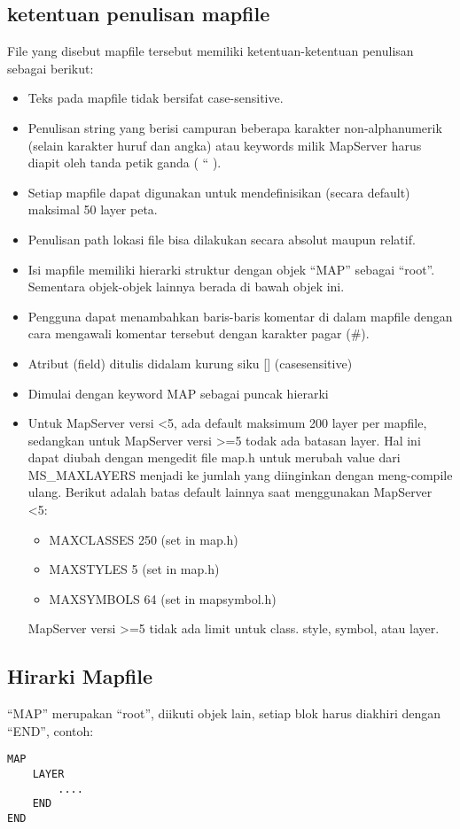 \begin{vebatim}
\subsection{ketentuan penulisan mapfile}
File yang disebut mapfile tersebut memiliki ketentuan-ketentuan penulisan sebagai berikut:
\begin{itemize}
	\item Teks pada mapfile tidak bersifat case-sensitive.
	\item Penulisan string yang berisi campuran beberapa karakter non-alphanumerik (selain karakter huruf dan angka) atau keywords milik MapServer harus diapit oleh tanda petik ganda ( “ ).
	\item Setiap mapfile dapat digunakan untuk mendefinisikan (secara default) maksimal 50 layer peta.
	\item Penulisan path lokasi file bisa dilakukan secara absolut maupun relatif.
	\item Isi mapfile memiliki hierarki struktur dengan objek “MAP” sebagai “root”. Sementara objek-objek lainnya berada di bawah objek ini.
	\item Pengguna dapat menambahkan baris-baris komentar di dalam mapfile dengan cara mengawali komentar tersebut dengan karakter pagar (#).
	\item Atribut (field) ditulis didalam kurung siku [] (casesensitive)
	\item Dimulai dengan keyword MAP sebagai puncak hierarki
	\item Untuk MapServer versi <5, ada default maksimum 200 layer per mapfile, sedangkan untuk MapServer versi >=5 todak ada batasan layer. Hal ini dapat diubah dengan mengedit file map.h untuk merubah value dari MS_MAXLAYERS menjadi ke jumlah yang diinginkan dengan meng-compile ulang. Berikut adalah batas default lainnya saat menggunakan MapServer <5:
		\begin{itemize}
			\item MAXCLASSES 250 (set in map.h)
			\item MAXSTYLES 5 (set in map.h)
			\item MAXSYMBOLS 64 (set in mapsymbol.h)
		\end{itemize}
		MapServer versi >=5 tidak ada limit untuk class. style, symbol, atau layer.
			
\end{itemize}

\subsection{Hirarki Mapfile}
“MAP” merupakan “root”, diikuti objek lain, setiap blok harus diakhiri dengan “END”, 
contoh:
\begin{verbatim}
MAP
	LAYER
		....
	END
END
\end{verbatim}



\end{vebatim}
